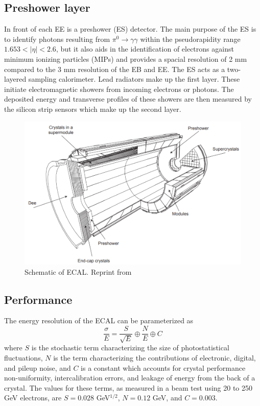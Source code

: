 \subsection{Preshower layer}
In front of each EE is a preshower (ES) detector.  The main purpose of the ES is to identify photons resulting from $\pi^{0}\rightarrow \gamma \gamma$ within the pseudorapidity range $1.653 < |\eta| < 2.6$, but it also aids in the identification of electrons against minimum ionizing particles (MIPs) and provides a spacial resolution of 2 mm compared to the 3 mm resolution of the EB and EE.  The ES acts as a two-layered sampling calorimeter.  Lead radiators make up the first layer.   These initiate electromagnetic showers from incoming electrons or photons.  The deposited energy and transverse profiles of these showers are then measured by the silicon strip sensors which make up the second layer.  

\begin{figure}[h]
	\centering
	\includegraphics[width=1.0\linewidth]{Figures/ECAL_layout}
	\caption{Schematic of ECAL. Reprint from \cite{Collaboration_2008}}
	\label{fig:ecallayout}
\end{figure}

\subsection{Performance}
The energy resolution of the ECAL can be parameterized as 
\begin{equation}
\frac{\sigma}{E} = \frac{S}{\sqrt{E}} \oplus \frac{N}{E} \oplus C
\end{equation}
where $S$ is the stochastic term characterizing the size of photostatistical fluctuations, $N$ is the term characterizing the contributions of electronic, digital, and pileup noise, and $C$ is a constant which accounts for crystal performance non-uniformity, intercalibration errors, and leakage of energy from the back of a crystal.  The values for these terms, as measured in a beam test using 20 to 250 GeV electrons, are $S=0.028$ GeV$^{1/2}$, $N=0.12$ GeV, and $C=0.003$.  \cite{Collaboration_2008}



